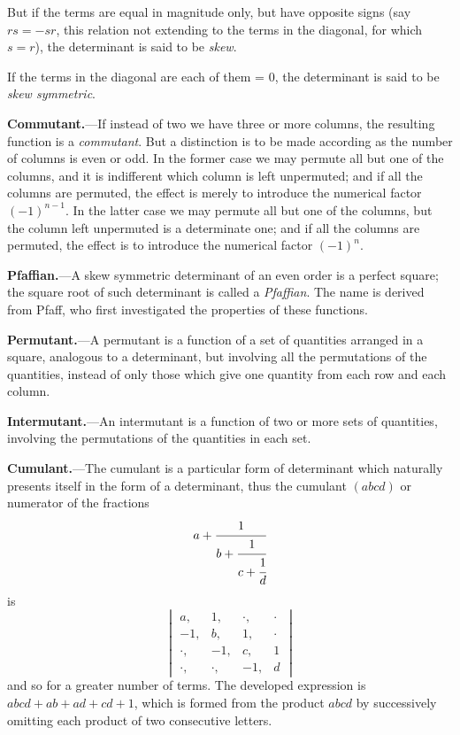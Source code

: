 \documentclass[11pt,a4paper]{book}
\begin{document}
But if the terms are equal in magnitude only, but have opposite signs (say $rs = -sr$, this relation not extending to the terms in the diagonal, for which $s = r$), the determinant is said to be \textit{skew}.

If the terms in the diagonal are each of them = 0, the determinant is said to be \textit{skew symmetric}.

\vspace{1em}

\noindent\textbf{Commutant.}---If instead of two we have three or more columns, the resulting function is a \textit{commutant}. But a distinction is to be made according as the number of columns is even or odd. In the former case we may permute all but one of the columns, and it is indifferent which column is left unpermuted; and if all the columns are permuted, the effect is merely to introduce the numerical factor $(-1)^{n-1}$. In the latter case we may permute all but one of the columns, but the column left unpermuted is a determinate one; and if all the columns are permuted, the effect is to introduce the numerical factor $(-1)^n$.

\vspace{1em}

\noindent\textbf{Pfaffian.}---A skew symmetric determinant of an even order is a perfect square; the square root of such determinant is called a \textit{Pfaffian}. The name is derived from Pfaff, who first investigated the properties of these functions.

\vspace{1em}

\noindent\textbf{Permutant.}---A permutant is a function of a set of quantities arranged in a square, analogous to a determinant, but involving all the permutations of the quantities, instead of only those which give one quantity from each row and each column.

\vspace{1em}

\noindent\textbf{Intermutant.}---An intermutant is a function of two or more sets of quantities, involving the permutations of the quantities in each set.

\vspace{1em}

\noindent\textbf{Cumulant.}---The cumulant is a particular form of determinant which naturally presents itself in the form of a determinant, thus the cumulant $(abcd)$ or numerator of the fractions
\[
a + \cfrac{1}{b + \cfrac{1}{c + \cfrac{1}{d}}}
\]
is
\[
\begin{vmatrix}
a, & 1, & \cdot, & \cdot \\
-1, & b, & 1, & \cdot \\
\cdot, & -1, & c, & 1 \\
\cdot, & \cdot, & -1, & d
\end{vmatrix}
\]
and so for a greater number of terms. The developed expression is $abcd + ab + ad + cd + 1$, which is formed from the product $abcd$ by successively omitting each product of two consecutive letters.
\end{document}
